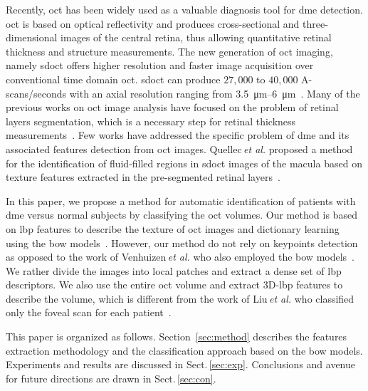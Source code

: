 Recently, \ac{oct} has been widely used as a valuable diagnosis tool for \ac{dme} detection.
\ac{oct} is based on optical reflectivity and produces cross-sectional and three-dimensional images of the central retina, thus allowing quantitative retinal thickness and structure measurements.
The new generation of \ac{oct} imaging, namely \ac{sdoct} offers higher resolution and faster image acquisition over conventional time domain \ac{oct}. \Ac{sdoct} can produce $27,000$ to $40,000$ A-scans/seconds with an axial resolution ranging from \SIrange{3.5}{6}{\micro \metre}~\cite{Chen2005}. 
Many of the previous works on \ac{oct} image analysis have focused on the problem of retinal layers segmentation, which is a necessary step for retinal thickness measurements~\cite{Chiu2010,Kafieh2013}.
Few works have addressed the specific problem of \ac{dme} and its associated features detection from \ac{oct} images. 
Quellec\,\textit{et al.} proposed a method for the identification of fluid-filled regions in \ac{sdoct} images of the macula based on texture features extracted in the pre-segmented retinal layers~\cite{Quellec2010}.


In this paper, we propose a method for automatic identification of patients with \ac{dme} versus normal subjects by classifying the \ac{oct} volumes. Our method is based on \ac{lbp} features to describe the texture of \ac{oct} images and dictionary learning using the \ac{bow} models~\cite{Sivic2003}.
However, our method do not rely on keypoints detection as opposed to the work of Venhuizen\,\textit{et al.} who also employed the \ac{bow} models~\cite{Venhuizen2015}. We rather divide the images into local patches and extract a dense set of \ac{lbp} descriptors.
We also use the entire \ac{oct} volume and extract 3D-\ac{lbp} features to describe the volume, which is different from the work of Liu\,\textit{et al.} who classified only the foveal scan for each patient~\cite{Liu2011}.

This paper is organized as follows. Section~\ref{sec:method} describes the features extraction methodology and the classification approach based on the \ac{bow} models. Experiments and results are discussed in Sect.\,\ref{sec:exp}. Conclusions and avenue for future directions are drawn in Sect.\,\ref{sec:con}.


